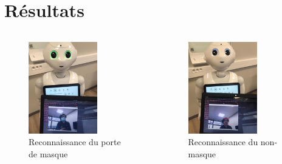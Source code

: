 \documentclass{cubeamer}
\begin{document}
\section{Résultats}
\begin{frame}
	\begin{columns}
		\begin{figure}[H]
			\includegraphics[width = 0.7\textwidth]{img/avecMasque.jpeg}
			\caption{Reconnaissance du porte de masque}
		\end{figure}
		\begin{figure}[H]
			\includegraphics[width = 0.7\textwidth]{img/pasDeMasque.jpeg}
			\caption{Reconnaissance du non-masque}
		\end{figure}
	\end{columns}
\end{frame}
\end{document}
